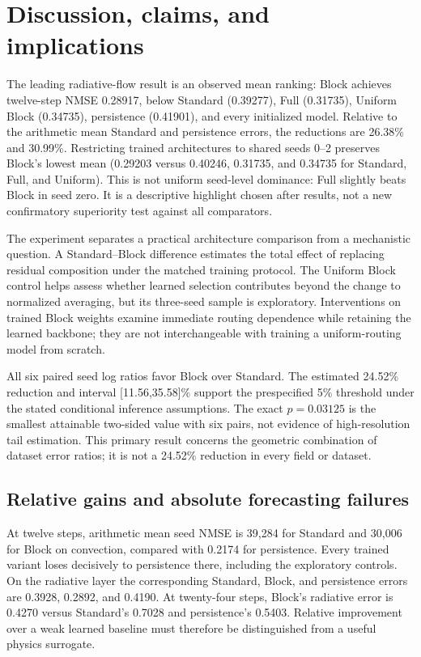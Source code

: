 \section{Discussion, claims, and implications}
The leading radiative-flow result is an observed mean ranking: Block achieves twelve-step NMSE 0.28917, below Standard (0.39277), Full (0.31735), Uniform Block (0.34735), persistence (0.41901), and every initialized model. Relative to the arithmetic mean Standard and persistence errors, the reductions are 26.38\% and 30.99\%. Restricting trained architectures to shared seeds 0--2 preserves Block's lowest mean (0.29203 versus 0.40246, 0.31735, and 0.34735 for Standard, Full, and Uniform). This is not uniform seed-level dominance: Full slightly beats Block in seed zero. It is a descriptive highlight chosen after results, not a new confirmatory superiority test against all comparators\cite{studycode}.

The experiment separates a practical architecture comparison from a mechanistic question. A Standard--Block difference estimates the total effect of replacing residual composition under the matched training protocol. The Uniform Block control helps assess whether learned selection contributes beyond the change to normalized averaging, but its three-seed sample is exploratory. Interventions on trained Block weights examine immediate routing dependence while retaining the learned backbone; they are not interchangeable with training a uniform-routing model from scratch.

All six paired seed log ratios favor Block over Standard. The estimated 24.52\% reduction and interval [11.56,35.58]\% support the prespecified 5\% threshold under the stated conditional inference assumptions. The exact $p=0.03125$ is the smallest attainable two-sided value with six pairs, not evidence of high-resolution tail estimation. This primary result concerns the geometric combination of dataset error ratios; it is not a 24.52\% reduction in every field or dataset.

\subsection{Relative gains and absolute forecasting failures}
At twelve steps, arithmetic mean seed NMSE is 39,284 for Standard and 30,006 for Block on convection, compared with 0.2174 for persistence. Every trained variant loses decisively to persistence there, including the exploratory controls. On the radiative layer the corresponding Standard, Block, and persistence errors are 0.3928, 0.2892, and 0.4190. At twenty-four steps, Block's radiative error is 0.4270 versus Standard's 0.7028 and persistence's 0.5403. Relative improvement over a weak learned baseline must therefore be distinguished from a useful physics surrogate.

